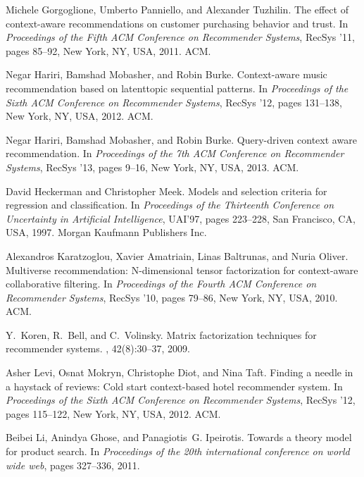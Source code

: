 \documentclass[preprint,12pt]{elsarticle}
\begin{document}
\begin{thebibliography}{10}
Michele Gorgoglione, Umberto Panniello, and Alexander Tuzhilin.
\newblock The effect of context-aware recommendations on customer purchasing
  behavior and trust.
\newblock In {\em Proceedings of the Fifth ACM Conference on Recommender
  Systems}, RecSys '11, pages 85--92, New York, NY, USA, 2011. ACM.

Negar Hariri, Bamshad Mobasher, and Robin Burke.
\newblock Context-aware music recommendation based on latenttopic sequential
  patterns.
\newblock In {\em Proceedings of the Sixth ACM Conference on Recommender
  Systems}, RecSys '12, pages 131--138, New York, NY, USA, 2012. ACM.

Negar Hariri, Bamshad Mobasher, and Robin Burke.
\newblock Query-driven context aware recommendation.
\newblock In {\em Proceedings of the 7th ACM Conference on Recommender
  Systems}, RecSys '13, pages 9--16, New York, NY, USA, 2013. ACM.

David Heckerman and Christopher Meek.
\newblock Models and selection criteria for regression and classification.
\newblock In {\em Proceedings of the Thirteenth Conference on Uncertainty in
  Artificial Intelligence}, UAI'97, pages 223--228, San Francisco, CA, USA,
  1997. Morgan Kaufmann Publishers Inc.

Alexandros Karatzoglou, Xavier Amatriain, Linas Baltrunas, and Nuria Oliver.
\newblock Multiverse recommendation: N-dimensional tensor factorization for
  context-aware collaborative filtering.
\newblock In {\em Proceedings of the Fourth ACM Conference on Recommender
  Systems}, RecSys '10, pages 79--86, New York, NY, USA, 2010. ACM.

Y.~Koren, R.~Bell, and C.~Volinsky.
\newblock Matrix factorization techniques for recommender systems.
, 42(8):30--37, 2009.

Asher Levi, Osnat Mokryn, Christophe Diot, and Nina Taft.
\newblock Finding a needle in a haystack of reviews: Cold start context-based
  hotel recommender system.
\newblock In {\em Proceedings of the Sixth ACM Conference on Recommender
  Systems}, RecSys '12, pages 115--122, New York, NY, USA, 2012. ACM.

Beibei Li, Anindya Ghose, and Panagiotis~G. Ipeirotis.
\newblock Towards a theory model for product search.
\newblock In {\em Proceedings of the 20th international conference on world
  wide web}, pages 327--336, 2011.


\end{thebibliography}
\end{document}
